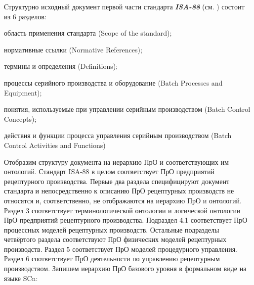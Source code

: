 Структурно исходный документ первой части стандарта \textbf{\textit{ISA-88}} (см. ) состоит из 6 разделов:
\begin{textitemize}
    \item область применения стандарта (Scope of the standard);
    \item нормативные ссылки (Normative References);
    \item термины и определения (Definitions);
    \item процессы серийного производства и оборудование (Batch Processes and Equipment);
    \item понятия, используемые при управлении серийным производством (Batch Control Concepts);
    \item действия и функции процесса управления серийным производством (Batch Control Activities and Functions)
\end{textitemize}

Отобразим структуру документа на иерархию ПрО и соответствующих им онтологий. Стандарт ISA-88 в целом соответствует ПрО предприятий рецептурного производства. Первые два раздела специфицируют документ стандарта и непосредственно к описанию ПрО рецептурных производств не относятся и, соответственно, не отображаются на иерархию ПрО и онтологий. Раздел 3 соответствует терминологической онтологии и логической онтологии ПрО предприятий рецептурного производства. Подраздел 4.1 соответствует ПрО процессных моделей рецептурных производств. Остальные подразделы четвёртого раздела соответствуют ПрО физических моделей рецептурных производств. Раздел 5 соответствует ПрО моделей процедурного управления. Раздел 6 соответствует ПрО деятельности по управлению рецептурным производством.
Запишем иерархию ПрО базового уровня в формальном виде на языке SCn:

\begin{SCn}
\end{SCn}



